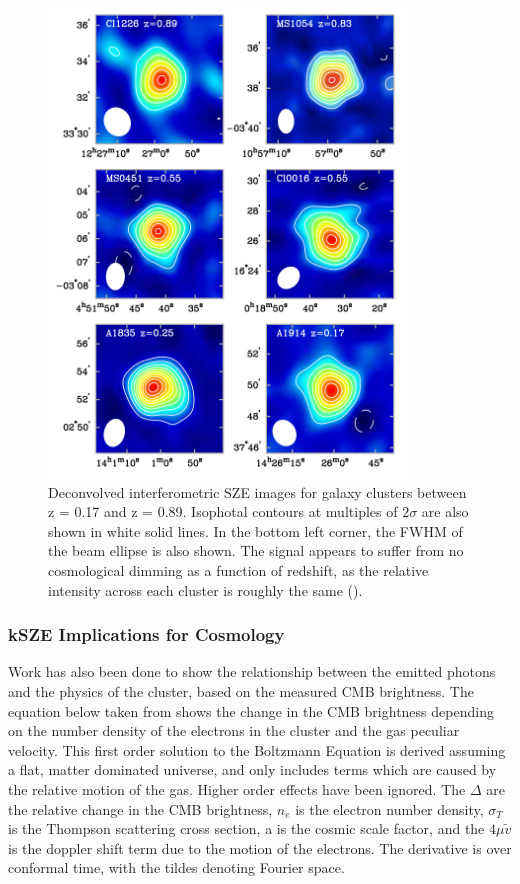 \documentclass[manuscript]{aastex}
\begin{document}
\newpage
\begin{figure}[H]
\centering
\captionsetup{width=0.85\textwidth}
\includegraphics[width=0.85\textwidth]{carlstrom1.png}
\caption[An example of the redshift independence of SZE measurements for six different clusters. -(\cite{Carlstrom2002})]{Deconvolved interferometric SZE images for galaxy clusters between z = 0.17 and z = 0.89. Isophotal contours at multiples of \(2\sigma\) are also shown in white solid lines. In the bottom left corner, the FWHM of the beam ellipse is also shown. The signal appears to suffer from no cosmological dimming as a function of redshift, as the relative intensity across each cluster is roughly the same (\cite{Carlstrom2002}).}
\end{figure}

\subsubsection{\textbf{kSZE Implications for Cosmology}}

Work has also been done to show the relationship between the emitted photons and the physics of the cluster, based on the measured CMB brightness. The equation below taken from \cite{Dodelson1995} shows the change in the CMB brightness depending on the number density of the electrons in the cluster and the gas peculiar velocity. This first order solution to the Boltzmann Equation is derived assuming a flat, matter dominated universe, and only includes terms which are caused by the relative motion of the gas. Higher order effects have been ignored. The $\Delta$ are the relative change in the CMB brightness, $n_{e}$ is the electron number density, $\sigma_{T}$ is the Thompson scattering cross section, a is the cosmic scale factor, and the $4 \mu \tilde v$ is the doppler shift term due to the motion of the electrons. The derivative is over conformal time, with the tildes denoting Fourier space. 
\end{document}
